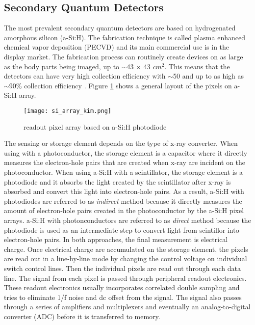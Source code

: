 \subsection{Secondary Quantum Detectors}
The most prevalent secondary quantum detectors are based on hydrogenated amorphous silicon (a-Si:H).  The fabrication technique is called plasma enhanced chemical vapor deposition (PECVD) and its main commercial use is in the display market.  The fabrication process can routinely create devices on as large as the body parts being imaged, up to $\sim$43 $\times$ 43 $cm^2$.  This means that the detectors can have very high collection efficiency with $\sim$50 and up to as high as $\sim$90$\%$ collection efficiency \cite{yorkston2007}.
Figure \ref{fig:a-Si:H array} shows a general layout of the pixels on a-Si:H array.  

\begin{figure}
\texttt{[image: si\_array\_kim.png]}
\label{fig:a-Si:H array}
\caption{readout pixel array based on a-Si:H photodiode}
\end{figure}

The sensing or storage element depends on the type of x-ray converter.  When using with a photoconductor, the storage element is a capacitor where it directly measures the electron-hole pairs that are created when x-ray are incident on the photoconductor.  When using a-Si:H with a scintillator, the storage element is a photodiode and it absorbs the light created by the scintillator after x-ray is absorbed and convert this light into electron-hole pairs.  As a result, a-Si:H with photodiodes are referred to as \textit{indirect} method because it directly measures the amount of electron-hole pairs created in the photoconductor by the a-Si:H pixel arrays.  a-Si:H with photonconductors are referred to as \textit{direct} method because the photodiode is used as an intermediate step to convert light from scintillor into electron-hole pairs.  In both approaches, the final measurement is electrical charge.  
Once electrical charge are accumulated on the storage element, the pixels are read out in a line-by-line mode by changing the control voltage on individual switch control lines.  Then the individual pixels are read out through each data line.  The signal from each pixel is passed through peripheral readout electronics.  These readout electronics usually incorporates correlated double sampling and tries to eliminate 1/f noise and dc offset from the signal.  The signal also passes through a series of amplifiers and multiplexers and eventually an analog-to-digital converter (ADC) before it is transferred to memory.  

